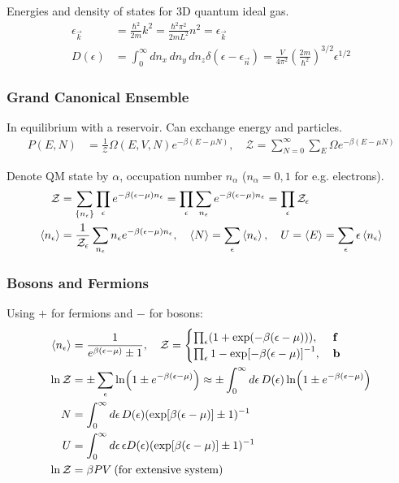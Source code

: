 \documentclass[a4paper, english, 12pt]{article}
\newcommand{\eps}{\epsilon}
\begin{document}
\begin{multicols*}{2}
Energies and density of states for 3D quantum ideal gas. 
\begin{align*}
    \epsilon_{\vec{k}} &= \frac{\hbar^2 }{2m}k^2 = \frac{\hbar^2 \pi^2}{2mL^2}n^2 = \epsilon_{\vec{k}} \\ 
    D(\epsilon) &= \int_0^\infty dn_x\,dn_y\,dn_z \delta(\epsilon-\epsilon_{\vec{n}}) = \frac{V}{4\pi^2} \left(\frac{2m}{\hbar^2}\right)^{3/2} \epsilon^{1/2}
\end{align*}



\subsubsection*{\scriptsize Grand Canonical Ensemble}
In equilibrium with a reservoir. Can exchange energy and particles. 
\begin{align*}
    P(E,N) &= \frac{1}{\mathcal{Z}}\Omega(E,V,N) e^{-\beta (E - \mu N)},\quad \mathcal{Z} = \sum_{N=0}^\infty \sum_E \Omega e^{-\beta (E - \mu N)}
\end{align*}

Denote QM state by $\alpha$, occupation number $n_\alpha$ ($n_\alpha=0,1$ for e.g. electrons). 
\begin{align*}
    \mathcal{Z} &= \sum_{\{n_\epsilon\}} \prod_\epsilon e^{-\beta(\epsilon-\mu)n_\epsilon} = \prod_\epsilon \sum_{n_\epsilon} e^{-\beta(\epsilon-\mu)n_\epsilon} = \prod_\epsilon \mathcal{Z}_\epsilon \\
    \expval{n_\epsilon} &= \frac{1}{\mathcal{Z}_\epsilon} \sum_{n_\epsilon} n_\epsilon e^{-\beta(\epsilon-\mu)n_\epsilon},\quad \expval{N} = \sum_\epsilon \expval{n_\epsilon},\quad U = \expval{E} = \sum_\eps \eps \expval{n_\eps}
\end{align*} 



\subsubsection*{\scriptsize Bosons and Fermions}
Using $+$ for fermions and $-$ for bosons: 
\begin{align*}
    \expval{n_\eps} &= \frac{1}{e^{\beta(\eps-\mu)} \pm 1},\quad \mathcal{Z} = \begin{cases}
        \prod_\eps (1+\exp(-\beta(\eps-\mu))),\:&\textbf{f} \\ 
        \prod_\eps {1-\exp[-\beta(\eps-\mu)]}^{-1},\:&\textbf{b}
    \end{cases} \\
    \ln \mathcal{Z} &= \pm \sum_\eps \ln(1 \pm e^{-\beta(\eps-\mu)}) \approx \pm \int_0^\infty d\eps\, D(\eps) \ln(1 \pm e^{-\beta(\eps-\mu)}) \\
    N &= \int_0^\infty d\eps\,D(\eps) (\exp[\beta(\eps-\mu)]\pm1)^{-1} \\ 
    U &= \int_0^\infty d\eps\, \eps D(\eps) (\exp[\beta(\eps-\mu)]\pm1)^{-1} \\ 
    \ln \mathcal{Z} &= \beta PV \:(\text{for extensive system})
\end{align*}




\end{multicols*}
\end{document}
